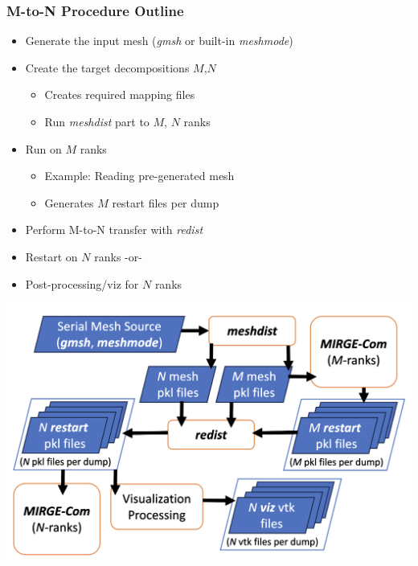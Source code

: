 \begin{frame}\frametitle{M-to-N Procedure Outline}
\begin{minipage}{0.49\textwidth}
\begin{itemize}
\item Generate the input mesh (\textit{gmsh} or built-in \textit{meshmode})
\color{lightgray}
\item Create the target decompositions $M$,$N$
  \begin{itemize}
  \color{lightgray}
  \item Creates required mapping files
  \item Run \textit{meshdist} part to $M$, $N$ ranks
  \end{itemize}
\item Run \mirgecom{} on $M$ ranks
\begin{itemize}
\color{lightgray}
\item Example: Reading pre-generated mesh
\item Generates $M$ restart files per dump
\end{itemize}
\item Perform M-to-N transfer with \textit{redist}
\item Restart \mirgecom{} on $N$ ranks -or-
\item Post-processing/viz for $N$ ranks
\end{itemize}
\end{minipage}
\hfill
\begin{minipage}{.49\textwidth}
\includegraphics[width=\textwidth]{Figures/mtc/redist_data_flow_full.png}
\end{minipage}
\end{frame}


